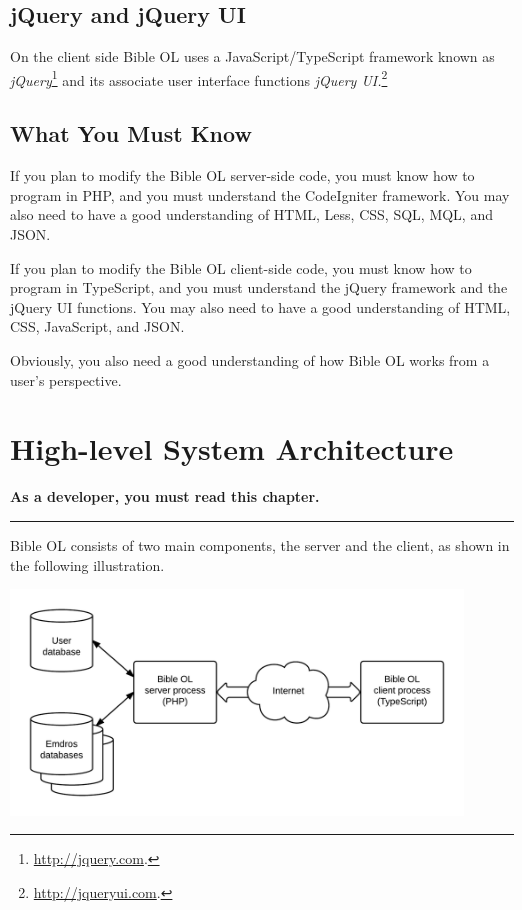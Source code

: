 \documentclass[11pt,oneside,a4paper]{memoir}
\begin{document}
\section{jQuery and jQuery UI}

On the client side Bible OL uses a JavaScript/TypeScript framework known as
\emph{jQuery}\footnote{\url{http://jquery.com}.} and its associate user interface functions
\emph{jQuery UI.}\footnote{\url{http://jqueryui.com}.}

\section{What You Must Know}

If you plan to modify the Bible OL server-side code, you must know how to program in PHP, and you
must understand the CodeIgniter framework. You may also need to have a good understanding of HTML,
Less, CSS, SQL, MQL, and JSON.

If you plan to modify the Bible OL client-side code, you must know how to program in TypeScript, and
you must understand the jQuery framework and the jQuery UI functions. You may also need to have a
good understanding of HTML, CSS, JavaScript, and JSON.

Obviously, you also need a good understanding of how Bible OL works from a user's perspective.


\chapter{High-level System Architecture}

\textbf{As a developer, you must read this chapter.}

\plainbreak{3}

Bible OL consists of two main components, the server and the
client, as shown in the following illustration.

\begin{center}
  \includegraphics[width=0.9\textwidth]{BOL_overview.png}
\end{center}
\end{document}
